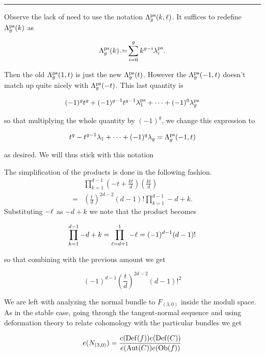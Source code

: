 \documentclass[12pt]{memoir}
\begin{document}
\hrule

\begin{Rmk}
    Observe the lack of need to use the notation \(\Lambda_g^{\operatorname{\mathrm{ps}}}(k,\ell)\). It suffices to redefine \(\Lambda_g^{\operatorname{\mathrm{ps}}}(k)\) as

    \[\La_g^{\ps}(k)\defeq\sum_{i=0}^{g}k^{g-i}\la_i^{\ps}.\]

    Then the old \(\Lambda_g^{\operatorname{\mathrm{ps}}}(1,t)\) is just the new \(\Lambda_g^{\operatorname{\mathrm{ps}}}(t)\). However the \(\Lambda_g^{\operatorname{\mathrm{ps}}}(-1,t)\) doesn't match up quite nicely with \(\Lambda_g^{\operatorname{\mathrm{ps}}}(-t)\). This last quantity is

    \[(-1)^gt^g+(-1)^{g-1}t^{g-1}\lambda_1^{\operatorname{\mathrm{ps}}}+\dots+(-1)^0\lambda_g^{\operatorname{\mathrm{ps}}}\]

    so that multiplying the whole quantity by \((-1)^g\), we change this expression to

    \[t^{g}-t^{g-1}\lambda_1+\dots+(-1)^g\lambda_g=\Lambda_g^{\operatorname{\mathrm{ps}}}(-1,t)\]

    as desired. We will thus stick with this notation

\end{Rmk}
\begin{ptcb}
    The simplification of the products is done in the following fashion.
    \begin{align*}
          & \prod_{k=1}^{d-1}\left(-t+\frac{kt}{d}\right)\left(\frac{kt}{d}\right) \\
        = & \left(\frac{t}{d}\right)^{2d-2}(d-1)!\prod_{k=1}^{d-1}-d+k.
    \end{align*}
    Substituting \(-\ell\) as \(-d+k\) we note that the product becomes

    \[\prod_{k=1}^{d-1}-d+k=\prod_{\ell=d+1}^{1}-\ell=(-1)^{d-1}(d-1)!\]

    so that combining with the previous amount we get

    \[(-1)^{d-1}\left(\frac{t}{d}\right)^{2d-2}(d-1)!^2\]

\end{ptcb}

We are left with analyzing the normal bundle to \(F_{(3,0)}\) inside the moduli space. As in the stable case, going through the tangent-normal sequence and using deformation theory to relate cohomology with the particular bundles we get

\[e(N_{(3,0)})=\frac{e(\operatorname{Def}(f))e(\operatorname{Def}(C))}{e(\operatorname{Aut}(C))e(\operatorname{Ob}(f))}\]
\end{document}
